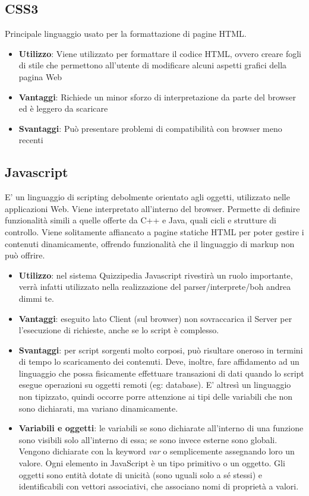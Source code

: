 \documentclass[a4paper,11pt]{article}
\begin{document}
	\subsection{CSS3}
	Principale linguaggio usato per la formattazione di pagine HTML.
	\begin{itemize}
		\item\textbf{Utilizzo}: Viene utilizzato per formattare il codice HTML,
ovvero creare fogli di stile che permettono all'utente di modificare alcuni aspetti grafici della
pagina Web
		\item\textbf{Vantaggi}: Richiede un minor sforzo di interpretazione da parte del browser ed è leggero da scaricare
		\item\textbf{Svantaggi}: Può presentare problemi di compatibilità con browser meno recenti
	\end{itemize}
	\subsection{Javascript}
	E' un linguaggio di scripting debolmente orientato agli oggetti, utilizzato nelle applicazioni
Web. Viene interpretato all'interno del browser. Permette di definire funzionalità simili a
quelle offerte da C++ e Java, quali cicli e strutture di controllo.
Viene solitamente affiancato a pagine statiche HTML per poter gestire i contenuti dinamicamente, offrendo funzionalità che il linguaggio di markup non può offrire.
	\begin{itemize}
		\item\textbf{Utilizzo}: nel sistema Quizzipedia Javascript rivestirà un ruolo importante, verrà infatti utilizzato nella realizzazione del parser/interprete/boh andrea dimmi te.
		\item\textbf{Vantaggi}: eseguito lato Client (sul browser) non sovraccarica il Server per l'esecuzione di richieste, anche se lo script è complesso.
		\item\textbf{Svantaggi}: per script sorgenti molto corposi, può risultare oneroso in termini di
tempo lo scaricamento dei contenuti. Deve, inoltre, fare affidamento ad un linguaggio
che possa fisicamente effettuare transazioni di dati quando lo script esegue operazioni
su oggetti remoti (eg: database).
E' altresì un linguaggio non tipizzato, quindi occorre porre attenzione ai tipi delle
variabili che non sono dichiarati, ma variano dinamicamente.
		\item\textbf{Variabili e oggetti}: le variabili se sono dichiarate all'interno di una funzione sono
visibili solo all'interno di essa; se sono invece esterne sono globali. Vengono dichiarate
con la keyword \emph{var} o semplicemente assegnando loro un valore.
Ogni elemento in JavaScript è un tipo primitivo o un oggetto.
Gli oggetti sono entità dotate di unicità (sono uguali solo a sé stessi) e identificabili
con vettori associativi, che associano nomi di proprietà a valori.
	\end{itemize}
\end{document}
